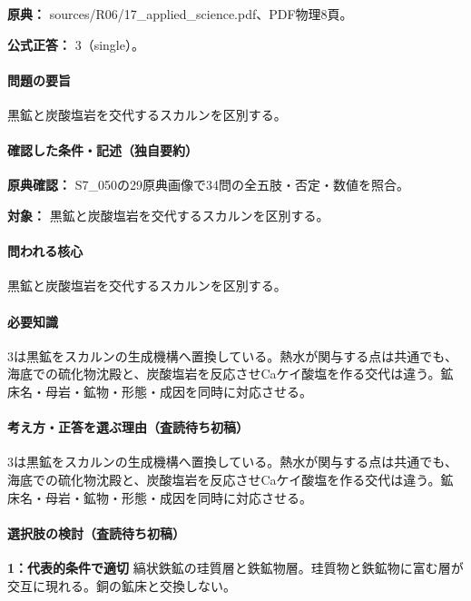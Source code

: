 \noindent\textbf{原典：} sources/R06/17\_applied\_science.pdf、PDF物理8頁。

\textbf{公式正答：} 3（single）。

\paragraph{問題の要旨} 黒鉱と炭酸塩岩を交代するスカルンを区別する。

\paragraph{確認した条件・記述（独自要約）}\mbox{}\par

\noindent\textbf{原典確認：} S7\_050の29原典画像で34問の全五肢・否定・数値を照合。\par

\noindent\textbf{対象：} 黒鉱と炭酸塩岩を交代するスカルンを区別する。\par

\paragraph{問われる核心} 黒鉱と炭酸塩岩を交代するスカルンを区別する。

\paragraph{必要知識} 3は黒鉱をスカルンの生成機構へ置換している。熱水が関与する点は共通でも、海底での硫化物沈殿と、炭酸塩岩を反応させCaケイ酸塩を作る交代は違う。鉱床名・母岩・鉱物・形態・成因を同時に対応させる。

\paragraph{考え方・正答を選ぶ理由（査読待ち初稿）} 3は黒鉱をスカルンの生成機構へ置換している。熱水が関与する点は共通でも、海底での硫化物沈殿と、炭酸塩岩を反応させCaケイ酸塩を作る交代は違う。鉱床名・母岩・鉱物・形態・成因を同時に対応させる。

\paragraph{選択肢の検討（査読待ち初稿）}\mbox{}\par

\noindent\textbf{1：代表的条件で適切} 縞状鉄鉱の珪質層と鉄鉱物層。珪質物と鉄鉱物に富む層が交互に現れる。銅の鉱床と交換しない。\par

